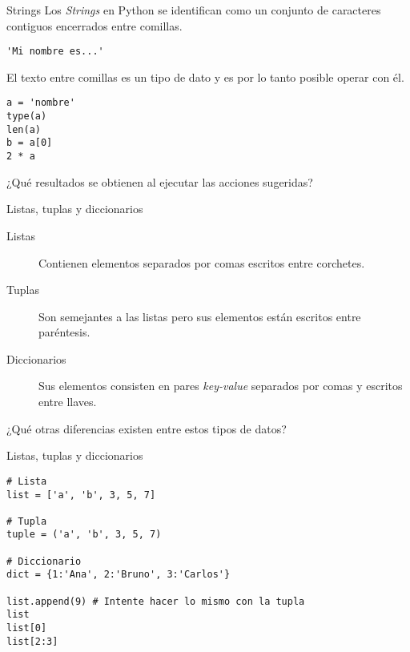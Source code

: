 \documentclass[10pt]{beamer}
\begin{document}
\begin{frame}[fragile]{Strings}
Los \emph{Strings} en Python se identifican como un conjunto de caracteres contiguos encerrados entre comillas.
\begin{verbatim}
'Mi nombre es...' 
\end{verbatim}
El texto entre comillas es un tipo de dato y es por lo tanto posible operar con él.
\begin{verbatim}
a = 'nombre'
type(a)
len(a)
b = a[0]
2 * a 
\end{verbatim}

\begin{center}
	¿Qué resultados se obtienen al ejecutar las acciones sugeridas?
\end{center}
\end{frame}

\begin{frame}[fragile]{Listas, tuplas y diccionarios}
	\begin{description}
		\item[Listas] Contienen elementos separados por comas escritos entre corchetes.
		\item[Tuplas] Son semejantes a las listas pero sus elementos están escritos entre paréntesis.
		\item[Diccionarios] Sus elementos consisten en pares \emph{key-value} separados por comas y escritos entre llaves.
	\end{description}

\vspace{1em}

\begin{center}
	¿Qué otras diferencias existen entre estos tipos de datos?
\end{center}
\end{frame}

\begin{frame}[fragile]{Listas, tuplas y diccionarios}
	\begin{verbatim}
# Lista 
list = ['a', 'b', 3, 5, 7]
	
# Tupla
tuple = ('a', 'b', 3, 5, 7) 

# Diccionario
dict = {1:'Ana', 2:'Bruno', 3:'Carlos'}

list.append(9) # Intente hacer lo mismo con la tupla
list 
list[0]
list[2:3]
	\end{verbatim}
\end{frame}
\end{document}
